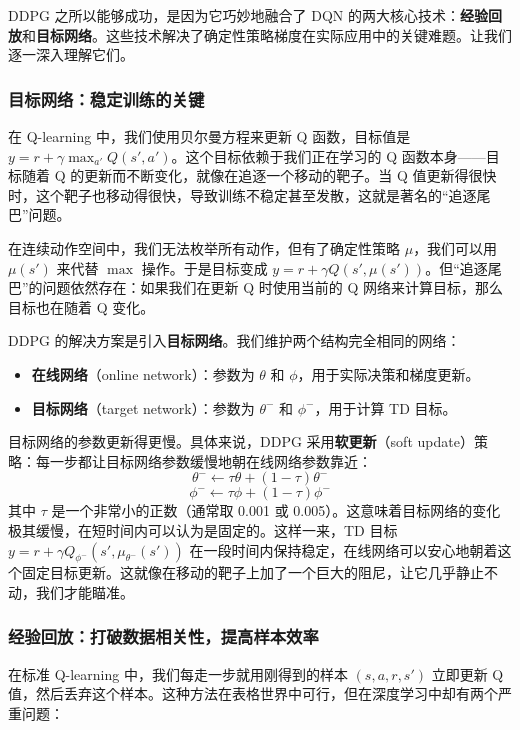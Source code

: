 \documentclass[lang=cn,zihao=-4,a4paper,fontset=windows]{beautybook}
\begin{document}
DDPG 之所以能够成功，是因为它巧妙地融合了 DQN 的两大核心技术：\textbf{经验回放}和\textbf{目标网络}。这些技术解决了确定性策略梯度在实际应用中的关键难题。让我们逐一深入理解它们。

\subsubsection{目标网络：稳定训练的关键}

在 Q-learning 中，我们使用贝尔曼方程来更新 Q 函数，目标值是 \(y = r + \gamma \max_{a'} Q(s', a')\)。这个目标依赖于我们正在学习的 Q 函数本身——目标随着 Q 的更新而不断变化，就像在追逐一个移动的靶子。当 Q 值更新得很快时，这个靶子也移动得很快，导致训练不稳定甚至发散，这就是著名的“追逐尾巴”问题。

在连续动作空间中，我们无法枚举所有动作，但有了确定性策略 \(\mu\)，我们可以用 \(\mu(s')\) 来代替 \(\max\) 操作。于是目标变成 \(y = r + \gamma Q(s', \mu(s'))\)。但“追逐尾巴”的问题依然存在：如果我们在更新 Q 时使用当前的 Q 网络来计算目标，那么目标也在随着 Q 变化。

DDPG 的解决方案是引入\textbf{目标网络}。我们维护两个结构完全相同的网络：
\begin{itemize}
    \item \textbf{在线网络}（online network）：参数为 \(\theta\) 和 \(\phi\)，用于实际决策和梯度更新。
    \item \textbf{目标网络}（target network）：参数为 \(\theta^-\) 和 \(\phi^-\)，用于计算 TD 目标。
\end{itemize}

目标网络的参数更新得更慢。具体来说，DDPG 采用\textbf{软更新}（soft update）策略：每一步都让目标网络参数缓慢地朝在线网络参数靠近：
\[
\theta^- \leftarrow \tau \theta + (1 - \tau) \theta^-
\]
\[
\phi^- \leftarrow \tau \phi + (1 - \tau) \phi^-
\]
其中 \(\tau\) 是一个非常小的正数（通常取 0.001 或 0.005）。这意味着目标网络的变化极其缓慢，在短时间内可以认为是固定的。这样一来，TD 目标 \(y = r + \gamma Q_{\phi^-}(s', \mu_{\theta^-}(s'))\) 在一段时间内保持稳定，在线网络可以安心地朝着这个固定目标更新。这就像在移动的靶子上加了一个巨大的阻尼，让它几乎静止不动，我们才能瞄准。

\subsubsection{经验回放：打破数据相关性，提高样本效率}

在标准 Q-learning 中，我们每走一步就用刚得到的样本 \((s, a, r, s')\) 立即更新 Q 值，然后丢弃这个样本。这种方法在表格世界中可行，但在深度学习中却有两个严重问题：
\end{document}
